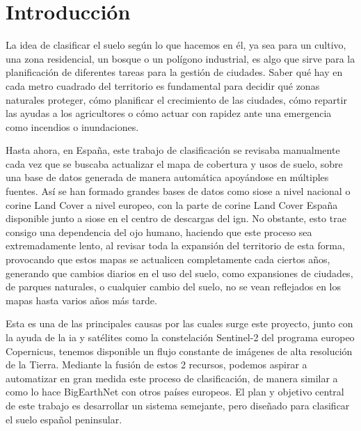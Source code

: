 \chapter[Introducción]{Introducción}
\label{cp:introduction}

La idea de clasificar el suelo según lo que hacemos en él, ya sea para un cultivo, una zona residencial, un bosque o un polígono industrial, 
es algo que sirve para la planificación de diferentes tareas para la gestión de ciudades. Saber qué hay en cada metro cuadrado del territorio
es fundamental para decidir qué zonas naturales proteger, cómo planificar el crecimiento de las ciudades, cómo repartir las ayudas a los
agricultores o cómo actuar con rapidez ante una emergencia como incendios o inundaciones.  


Hasta ahora, en España, este trabajo de clasificación se revisaba manualmente cada vez que se buscaba actualizar el mapa de cobertura y usos de 
suelo, sobre una base de datos generada de manera automática apoyándose en múltiples fuentes. Así se han formado grandes bases de datos como
\acrfull{siose} a nivel nacional o \acrshort{corine} Land Cover a nivel europeo, con la parte de \acrshort{corine} Land Cover España disponible
junto a \acrshort{siose} en el centro de descargas del \acrfull{ign}. No obstante, esto trae consigo una dependencia del ojo humano, haciendo
que este proceso sea extremadamente lento, al revisar toda la expansión del territorio de esta forma, provocando que estos mapas se actualicen
completamente cada ciertos años, generando que cambios diarios en el uso del suelo, como expansiones de ciudades, de parques naturales, o cualquier
cambio del suelo, no se vean reflejados en los mapas hasta varios años más tarde.


Esta es una de las principales causas por las cuales surge este proyecto, junto con la ayuda de la \acrshort{ia} y satélites como la
constelación Sentinel-2 del programa europeo Copernicus, tenemos disponible un flujo constante de imágenes de alta resolución de la Tierra. 
Mediante la fusión de estos 2 recursos, podemos aspirar a automatizar en gran medida este proceso de clasificación, de manera similar a como 
lo hace BigEarthNet con otros países europeos. El plan y objetivo central de este trabajo es desarrollar un sistema semejante, pero diseñado
para clasificar el suelo español peninsular.



